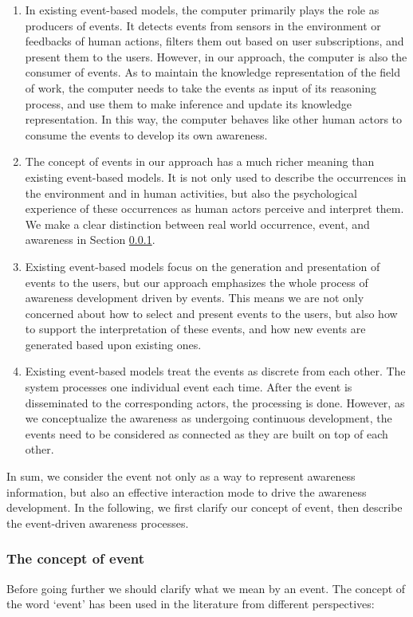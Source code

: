 \begin{enumerate}
   \item In existing event-based models, the computer primarily plays the role as producers of events. It detects events from sensors in the environment or feedbacks of human actions, filters them out based on user subscriptions, and present them to the users. However, in our approach, the computer is also the consumer of events. As to maintain the knowledge representation of the field of work, the computer needs to take the events as input of its reasoning process, and use them to make inference and update its knowledge representation. In this way, the computer behaves like other human actors to consume the events to develop its own awareness.
   \item The concept of events in our approach has a much richer meaning than existing event-based models. It is not only used to describe the occurrences in the environment and in human activities, but also the psychological experience of these occurrences as human actors perceive and interpret them. We make a clear distinction between real world occurrence, event, and awareness in Section \ref{ssub:the_concept_of_events}.
   \item Existing event-based models focus on the generation and presentation of events to the users, but our approach emphasizes the whole process of awareness development driven by events. This means we are not only concerned about how to select and present events to the users, but also how to support the interpretation of these events, and how new events are generated based upon existing ones.
   \item Existing event-based models treat the events as discrete from each other. The system processes one individual event each time. After the event is disseminated to the corresponding actors, the processing is done. However, as we conceptualize the awareness as undergoing continuous development, the events need to be considered as connected as they are built on top of each other.
\end{enumerate}

In sum, we consider the event not only as a way to represent awareness information, but also an effective interaction mode to drive the awareness development. In the following, we first clarify our concept of event, then describe the event-driven awareness processes. 

\subsubsection{The concept of event} %
\label{ssub:the_concept_of_events}
Before going further we should clarify what we mean by an event. The concept of the word `event' has been used in the literature from different perspectives:

